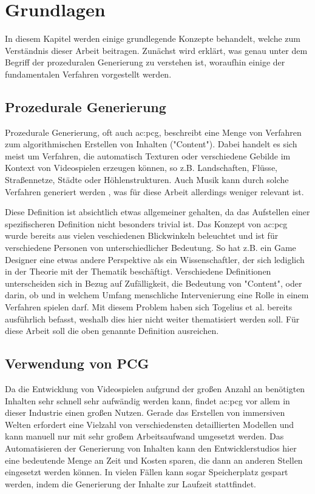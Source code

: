 %
\chapter{Grundlagen}
In diesem Kapitel werden einige grundlegende Konzepte behandelt, welche zum Verständnis dieser Arbeit beitragen. Zunächst wird
erklärt, was genau unter dem Begriff der prozeduralen Generierung zu verstehen ist, woraufhin einige der fundamentalen Verfahren
vorgestellt werden.

\section{Prozedurale Generierung}
Prozedurale Generierung, oft auch \gls{ac:pcg}, beschreibt eine Menge von Verfahren zum
algorithmischen Erstellen von Inhalten ("Content"). Dabei handelt es sich meist um Verfahren, die automatisch Texturen
oder verschiedene Gebilde im Kontext von Videospielen erzeugen können, so z.B. Landschaften, Flüsse, Straßennetze,
Städte oder Höhlenstrukturen. \cite{14_carli_et_al} Auch Musik kann durch solche Verfahren generiert werden
\cite{28_ramanto_maulidevi}, was für diese Arbeit allerdings weniger relevant ist.

Diese Definition ist absichtlich etwas allgemeiner gehalten, da das Aufstellen einer spezifischeren Definition nicht
besonders trivial ist. Das Konzept von \gls{ac:pcg} wurde bereits aus vielen veschiedenen Blickwinkeln beleuchtet und ist für verschiedene
Personen von unterschiedlicher Bedeutung. So hat z.B. ein Game Designer eine etwas andere Perspektive als ein Wissenschaftler, der
sich lediglich in der Theorie mit der Thematik beschäftigt. Verschiedene Definitionen unterscheiden sich in Bezug auf
Zufälligkeit, die Bedeutung von "Content", oder darin, ob und in welchem Umfang menschliche Intervenierung eine Rolle in einem
Verfahren spielen darf. Mit diesem Problem haben sich Togelius et al. \cite{9_togelius_et_al} bereits ausführlich befasst, weshalb dies hier
nicht weiter thematisiert werden soll. Für diese Arbeit soll die oben genannte Definition ausreichen.

\section{Verwendung von PCG}
Da die Entwicklung von Videospielen aufgrund der großen Anzahl an benötigten Inhalten sehr schnell sehr aufwändig werden
kann, findet \gls{ac:pcg} vor allem in dieser Industrie einen großen Nutzen. Gerade das Erstellen von immersiven Welten erfordert eine Vielzahl
von verschiedensten detaillierten Modellen und kann manuell nur mit sehr großem Arbeitsaufwand umgesetzt werden. Das Automatisieren der
Generierung von Inhalten kann den Entwicklerstudios hier eine bedeutende Menge an Zeit und Kosten sparen, die dann an anderen
Stellen eingesetzt werden können. In vielen Fällen kann sogar Speicherplatz gespart werden, indem die Generierung der Inhalte
zur Laufzeit stattfindet.

